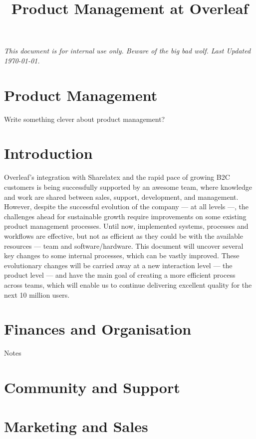 \documentclass[11pt,a4paper,parskip=half]{scrartcl}
\title{Product Management at Overleaf}
\begin{document}
\maketitle
\vspace{-1em}
\textit{This document is for internal use only. Beware of the big bad wolf. Last Updated \today.}

\section*{Product Management} 

Write something clever about product management?

\tableofcontents
\newpage 

\section{Introduction}
Overleaf’s integration with Sharelatex and the rapid pace of growing B2C customers is being successfully supported by an awesome team, where knowledge and work are shared between sales, support, development, and management.
However, despite the successful evolution of the company — at all levels —, the challenges ahead for sustainable growth require improvements on some existing product management processes. Until now, implemented systems, processes and workflows are effective, but not as efficient as they could be with the available resources — team and software/hardware.
This document will uncover several key changes to some internal processes, which can be vastly improved. These evolutionary changes will be carried away at a new interaction level — the product level — and have the main goal of creating a more efficient process across teams, which will enable us to continue delivering excellent quality for the next 10 million users.

\section{Finances and Organisation}
Notes

\section{Community and Support}

\section{Marketing and Sales}
\end{document}
